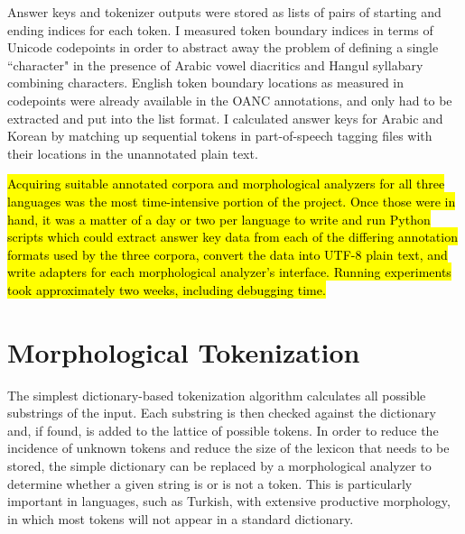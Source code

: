 Answer keys and tokenizer outputs were stored as lists of pairs of starting and ending indices for each token. I measured token boundary indices in terms of Unicode codepoints in order to abstract away the problem of defining a single ``character" in the presence of Arabic vowel diacritics and Hangul syllabary combining characters. English token boundary locations as measured in codepoints were already available in the OANC annotations, and only had to be extracted and put into the list format. I calculated answer keys for Arabic and Korean by matching up sequential tokens in part-of-speech tagging files with their locations in the unannotated plain text.

\hl{Acquiring suitable annotated corpora and morphological analyzers for all three languages was the most time-intensive portion of the project. Once those were in hand, it was a matter of a day or two per language to write and run Python scripts which could extract answer key data from each of the differing annotation formats used by the three corpora, convert the data into UTF-8 plain text, and write adapters for each morphological analyzer's interface. Running experiments took approximately two weeks, including debugging time.}

\section{Morphological Tokenization}
The simplest dictionary-based tokenization algorithm calculates all possible substrings of the input. Each substring is then checked against the dictionary and, if found, is added to the lattice of possible tokens. In order to reduce the incidence of unknown tokens and reduce the size of the lexicon that needs to be stored, the simple dictionary can be replaced by a morphological analyzer to determine whether a given string is or is not a token. This is particularly important in languages, such as Turkish, with extensive productive morphology, in which most tokens will not appear in a standard dictionary.

